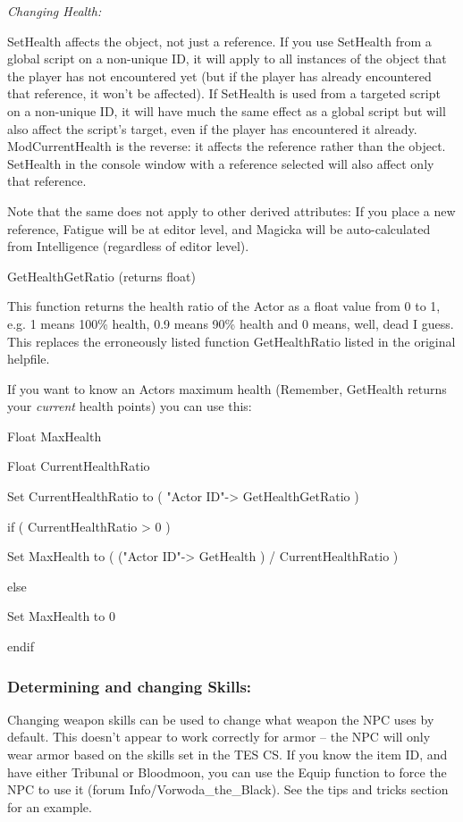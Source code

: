 \emph{Changing Health:}

SetHealth affects the object, not just a reference. If you use SetHealth
from a global script on a non-unique ID, it will apply to all instances
of the object that the player has not encountered yet (but if the player
has already encountered that reference, it won't be affected). If
SetHealth is used from a targeted script on a non-unique ID, it will
have much the same effect as a global script but will also affect the
script's target, even if the player has encountered it already.
ModCurrentHealth is the reverse: it affects the reference rather than
the object. SetHealth in the console window with a reference selected
will also affect only that reference.

Note that the same does not apply to other derived attributes: If you
place a new reference, Fatigue will be at editor level, and Magicka will
be auto-calculated from Intelligence (regardless of editor level).

GetHealthGetRatio (returns float)

This function returns the health ratio of the Actor as a float value
from 0 to 1, e.g. 1 means 100\% health, 0.9 means 90\% health and 0
means, well, dead I guess. This replaces the erroneously listed function
GetHealthRatio listed in the original helpfile.

If you want to know an Actors maximum health (Remember, GetHealth
returns your \emph{current} health points) you can use this:

Float MaxHealth

Float CurrentHealthRatio

Set CurrentHealthRatio to ( "Actor ID"-> GetHealthGetRatio )

if ( CurrentHealthRatio > 0 )

Set MaxHealth to ( ("Actor ID"-> GetHealth ) /
CurrentHealthRatio )

else

Set MaxHealth to 0

endif

\hypertarget{determining-and-changing-skills}{%
\subsubsection{Determining and changing
Skills:}\label{determining-and-changing-skills}}

Changing weapon skills can be used to change what weapon the NPC uses by
default. This doesn't appear to work correctly for armor -- the NPC will
only wear armor based on the skills set in the TES CS. If you know the
item ID, and have either Tribunal or Bloodmoon, you can use the Equip
function to force the NPC to use it (forum Info/Vorwoda\_the\_Black).
See the tips and tricks section for an example.


